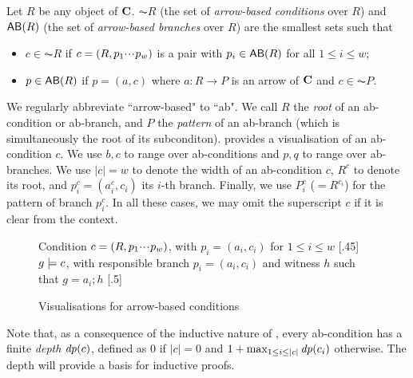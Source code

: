 \begin{definition}
  Let $R$ be any object of $\mathbf{C}$. $\AC R$ (the set of \emph{arrow-based conditions} over $R$) and $\AB R$ (the set of \emph{arrow-based branches} over $R$) are the smallest sets such that
  \begin{itemize}
  \item $c\in \AC R$ if $c=(R,p_1{\cdotp\mkern-2mu\cdotp\mkern-2mu\cdotp\mkern1mu} p_w)$ is a pair with $p_i\in \AB R$ for all $1\leq i\leq w$;
  \item $p\in \AB R$ if $p=(a,c)$ where $a: R\to P$ is an arrow of $\mathbf{C}$ and $c\in \AC P$.
  \end{itemize}
\end{definition}
%
We regularly abbreviate ``arrow-based" to ``ab". We call $R$ the \emph{root} of an ab-condition or ab-branch, and $P$ the \emph{pattern} of an ab-branch (which is simultaneously the root of its subconditon).  provides a visualisation of an ab-condition $c$. We use $b,c$ to range over ab-conditions and $p,q$ to range over ab-branches. We use $|c|=w$ to denote the width of an ab-condition $c$, $R^c$ to denote its root, and $p^c_i=(a^c_i,c_i)$ its $i$-th branch. Finally, we use $P^c_i$ ($=R^{c_i}$) for the pattern of branch $p^c_i$. In all these cases, we may omit the superscript $c$ if it is clear from the context.
%
\begin{figure}[t]
\centering
\subcaptionbox
  {Condition $c=(R,p_1{\cdotp\mkern-2mu\cdotp\mkern-2mu\cdotp\mkern1mu} p_w)$, with $p_i=(a_i,c_i)$ for $1\leq i\leq w$
   }
  [.45\textwidth]
  {}
\quad
\subcaptionbox
  {$g\models c$, with responsible branch $p_i=(a_i,c_i)$ and witness $h$ such that $g=a_i;h$
   }
  [.5\textwidth]
  {}
\caption{Visualisations for arrow-based conditions}
\end{figure}

Note that, as a consequence of the inductive nature of , every ab-condition has a finite \emph{depth} $\mathit{dp}(c)$, defined as $0$ if $|c|=0$ and $1+\max_{1\leq i\leq |c|} \mathit{dp}(c_i)$ otherwise. The depth will provide a basis for inductive proofs.

